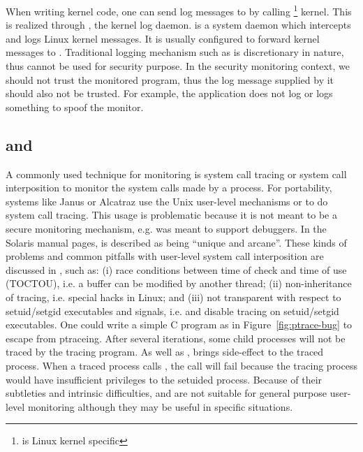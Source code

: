 When writing kernel code, one can send log messages to  by calling
\footnote{ is Linux kernel specific} kernel.  This is
realized through , the kernel log daemon.   is a system
daemon which intercepts and logs Linux kernel messages. It is usually
configured to forward kernel messages to . Traditional logging
mechanism such as  is discretionary in nature, thus cannot be used
for security purpose. In the security monitoring context, we should not trust
the monitored program, thus the log message supplied by it should also not be
trusted. For example, the application does not log or logs something to spoof
the monitor.

\subsection{ and }

A commonly used technique for monitoring is system call tracing or system call
interposition to monitor the system calls made by a process.
For portability, systems like Janus \cite{wagner1999janus} or Alcatraz \cite{liang2009alcatraz}
use the Unix user-level mechanisms  or  to do
system call tracing.
This usage is problematic because it is not
meant to be a secure monitoring mechanism, e.g.
 was meant to support debuggers.
In the Solaris manual pages,  is described as being
``unique and arcane''.
These kinds of problems and common
pitfalls with user-level system call interposition
are discussed in \cite{garfinkel2003traps}, such as:
(i) race conditions between time of check and time of use (TOCTOU), 
i.e. a buffer can be modified by another thread;
(ii) non-inheritance of tracing, i.e. special  hacks in Linux;
and (iii) not transparent with respect to setuid/setgid executables 
and signals,
i.e.  and  disable tracing 
on setuid/setgid executables.  
One could write a simple C program as in Figure~\ref{fig:ptrace-bug}
to escape from ptraceing.
After several iterations, some
child processes will not be traced by the tracing program.
As well as , 
brings side-effect to the traced process.
When a traced process calls ,
the call will fail because the tracing process would have insufficient
privileges to the setuided process.
Because of their subtleties and intrinsic difficulties,
 and  are not suitable for general purpose user-level
monitoring although they may be useful in specific situations.

